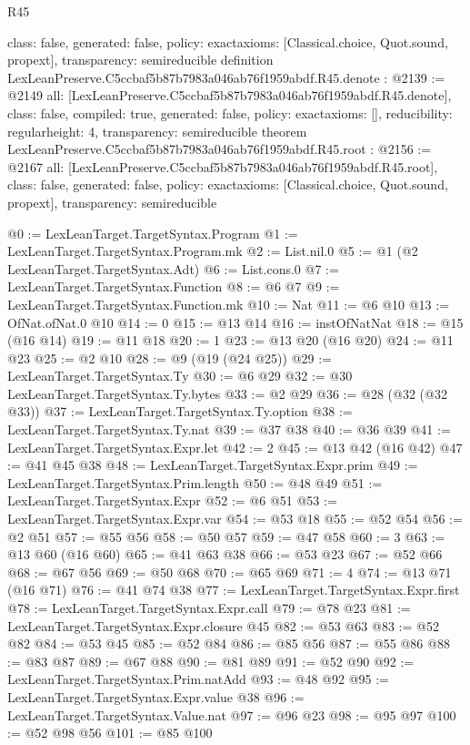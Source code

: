 \begin{lexlean}{R45}
\begin{coremodule}
{  class: false,
  generated: false,
  policy: exact{axioms: [Classical.choice, Quot.sound, propext]},
  transparency: semireducible
}
definition LexLeanPreserve.C5ccbaf5b87b7983a046ab76f1959abdf.R45.denote : @2139 := @2149 {
  all: [LexLeanPreserve.C5ccbaf5b87b7983a046ab76f1959abdf.R45.denote],
  class: false,
  compiled: true,
  generated: false,
  policy: exact{axioms: []},
  reducibility: regular{height: 4},
  transparency: semireducible
}
theorem LexLeanPreserve.C5ccbaf5b87b7983a046ab76f1959abdf.R45.root : @2156 := @2167 {
  all: [LexLeanPreserve.C5ccbaf5b87b7983a046ab76f1959abdf.R45.root],
  class: false,
  generated: false,
  policy: exact{axioms: [Classical.choice, Quot.sound, propext]},
  transparency: semireducible
}

@0 := LexLeanTarget.TargetSyntax.Program
@1 := LexLeanTarget.TargetSyntax.Program.mk
@2 := List.nil.{0}
@5 := @1 (@2 LexLeanTarget.TargetSyntax.Adt)
@6 := List.cons.{0}
@7 := LexLeanTarget.TargetSyntax.Function
@8 := @6 @7
@9 := LexLeanTarget.TargetSyntax.Function.mk
@10 := Nat
@11 := @6 @10
@13 := OfNat.ofNat.{0} @10
@14 := 0
@15 := @13 @14
@16 := instOfNatNat
@18 := @15 (@16 @14)
@19 := @11 @18
@20 := 1
@23 := @13 @20 (@16 @20)
@24 := @11 @23
@25 := @2 @10
@28 := @9 (@19 (@24 @25))
@29 := LexLeanTarget.TargetSyntax.Ty
@30 := @6 @29
@32 := @30 LexLeanTarget.TargetSyntax.Ty.bytes
@33 := @2 @29
@36 := @28 (@32 (@32 @33))
@37 := LexLeanTarget.TargetSyntax.Ty.option
@38 := LexLeanTarget.TargetSyntax.Ty.nat
@39 := @37 @38
@40 := @36 @39
@41 := LexLeanTarget.TargetSyntax.Expr.let
@42 := 2
@45 := @13 @42 (@16 @42)
@47 := @41 @45 @38
@48 := LexLeanTarget.TargetSyntax.Expr.prim
@49 := LexLeanTarget.TargetSyntax.Prim.length
@50 := @48 @49
@51 := LexLeanTarget.TargetSyntax.Expr
@52 := @6 @51
@53 := LexLeanTarget.TargetSyntax.Expr.var
@54 := @53 @18
@55 := @52 @54
@56 := @2 @51
@57 := @55 @56
@58 := @50 @57
@59 := @47 @58
@60 := 3
@63 := @13 @60 (@16 @60)
@65 := @41 @63 @38
@66 := @53 @23
@67 := @52 @66
@68 := @67 @56
@69 := @50 @68
@70 := @65 @69
@71 := 4
@74 := @13 @71 (@16 @71)
@76 := @41 @74 @38
@77 := LexLeanTarget.TargetSyntax.Expr.first
@78 := LexLeanTarget.TargetSyntax.Expr.call
@79 := @78 @23
@81 := LexLeanTarget.TargetSyntax.Expr.closure @45
@82 := @53 @63
@83 := @52 @82
@84 := @53 @45
@85 := @52 @84
@86 := @85 @56
@87 := @55 @86
@88 := @83 @87
@89 := @67 @88
@90 := @81 @89
@91 := @52 @90
@92 := LexLeanTarget.TargetSyntax.Prim.natAdd
@93 := @48 @92
@95 := LexLeanTarget.TargetSyntax.Expr.value @38
@96 := LexLeanTarget.TargetSyntax.Value.nat
@97 := @96 @23
@98 := @95 @97
@100 := @52 @98 @56
@101 := @85 @100

\end{coremodule}
\end{lexlean}
